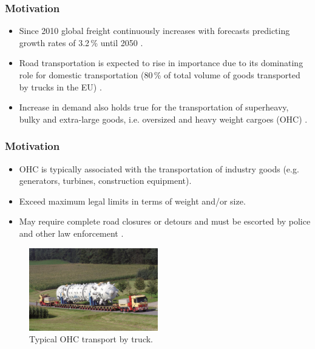 \documentclass{beamer}   %
\newcommand{\RNum}[1]{\uppercase\expandafter{\romannumeral #1\relax}}
\theoremstyle{break}
\begin{document}
  \begin{frame}
    \frametitle{Motivation \RNum{1}}
    \begin{itemize}
      \item Since 2010 global freight continuously increases with forecasts predicting growth rates of 3.2\,\% until 2050 \cite{figura2020preferences, InternationalTransportForum}.
      \item Road transportation is expected to rise in importance due to its dominating role for domestic transportation (80\,\% of total volume of goods transported by trucks in the EU) \cite{Eurostat}.
      \item Increase in demand also holds true for the transportation of superheavy, bulky and extra-large goods, i.e. oversized and heavy weight cargoes (OHC) \cite{gavrilova2021analysis, Luo.2021}.
    \end{itemize}
  \end{frame}

  \begin{frame}
    \frametitle{Motivation \RNum{2}}
    \begin{itemize}
      \item OHC is typically associated with the transportation of industry goods (e.g. generators, turbines, construction equipment).
      \item Exceed maximum legal limits in terms of weight and/or size.
      \item May require complete road closures or detours and must be escorted by police and other law enforcement \cite{Luo.2021}.
    \end{itemize}

    \begin{figure}[!ht]
      \centering
      \includegraphics[width=0.5\textwidth]{../manuscript/figures/OHC.jpg}
      \caption{Typical OHC transport by truck.}
      \label{fig:higher level}
    \end{figure}

  \end{frame}
\end{document}
